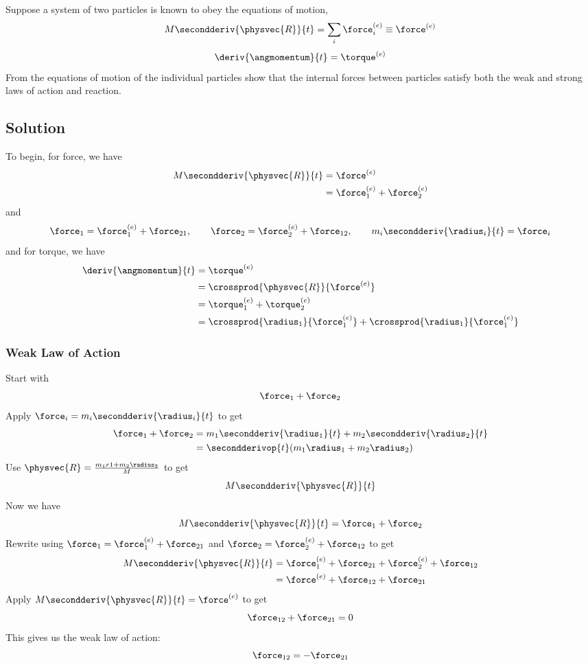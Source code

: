 Suppose a system of two particles is known to obey the equations of motion,
\[M\secondderiv{\physvec{R}}{t} =
\sum_i\force^{(e)}_i \equiv
\force^{(e)}\]
\[\deriv{\angmomentum}{t} = \torque^{(e)}\]
From the equations of motion of the individual particles show that the
internal forces between particles satisfy both the weak and strong
laws of action and reaction.

\subsection*{Solution}

To begin, for force, we have
\begin{align*}
  M\secondderiv{\physvec{R}}{t}
  &=
  \force^{(e)} \\
  &=
  \force^{(e)}_1 + \force^{(e)}_2
\end{align*}
and
\[
\force_1 = \force^{(e)}_1 + \force_{21},\qquad
\force_2 = \force^{(e)}_2 + \force_{12},\qquad
m_i\secondderiv{\radius_i}{t} = \force_i
\]
and for torque, we have
\begin{align*}
  \deriv{\angmomentum}{t}
  &=
  \torque^{(e)} \\
  &=
  \crossprod{\physvec{R}}{\force^{(e)}} \\
  &=
  \torque^{(e)}_1 + \torque^{(e)}_2 \\
  &=
  \crossprod{\radius_1}{\force^{(e)}_1} + \crossprod{\radius_1}{\force^{(e)}_1}
\end{align*}

\subsubsection*{Weak Law of Action}

Start with
\[\force_1 + \force_2\]
Apply $\force_i = m_i\secondderiv{\radius_i}{t}$ to get
\begin{align*}
  \force_1 + \force_2
  &=
  m_1\secondderiv{\radius_1}{t} + m_2\secondderiv{\radius_2}{t} \\
  &=
  \secondderivop{t}(m_1\radius_1 + m_2\radius_2)
\end{align*}
Use $\physvec{R} = \frac{m_1r1 + m_2\radius_2}{M}$ to get
\[M\secondderiv{\physvec{R}}{t}\]
Now we have
\[M\secondderiv{\physvec{R}}{t} = \force_1 + \force_2\]
Rewrite using $\force_1 = \force^{(e)}_1 + \force_{21}$ and $\force_2 =
\force^{(e)}_2 + \force_{12}$ to get
\begin{align*}
  M\secondderiv{\physvec{R}}{t}
  &=
  \force^{(e)}_1 + \force_{21} + \force^{(e)}_2 + \force_{12} \\
  &=
  \force^{(e)} + \force_{12} + \force_{21}
\end{align*}
Apply $M\secondderiv{\physvec{R}}{t} = \force^{(e)}$ to get
\[\force_{12} + \force_{21} = 0\]
This gives us the weak law of action:
\[\force_{12} = -\force_{21}\]


